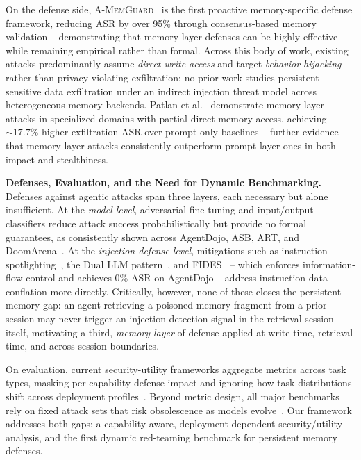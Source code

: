 \documentclass[sigconf]{acmart}
\begin{document}
On the defense side, \textsc{A-MemGuard}~\citep{wei2025amemguard} is the first proactive
memory-specific defense framework, reducing ASR by over 95\% through consensus-based memory
validation -- demonstrating that memory-layer defenses can be highly effective while
remaining empirical rather than formal.
Across this body of work, existing attacks predominantly assume \emph{direct write access}
and target \emph{behavior hijacking} rather than privacy-violating exfiltration; no prior
work studies persistent sensitive data exfiltration under an indirect injection threat model
across heterogeneous memory backends.
Patlan et al.~\citep{patlan2025real,patlan2025context} demonstrate memory-layer attacks
in specialized domains with partial direct memory access, achieving ${\sim}17.7\%$ higher
exfiltration ASR over prompt-only baselines -- further evidence that memory-layer attacks
consistently outperform prompt-layer ones in both impact and stealthiness.

\textbf{Defenses, Evaluation, and the Need for Dynamic Benchmarking.}
Defenses against agentic attacks span three layers, each necessary but alone insufficient.
At the \emph{model level}, adversarial fine-tuning and input/output classifiers reduce
attack success probabilistically but provide no formal guarantees, as consistently shown
across AgentDojo, ASB, ART, and DoomArena~\citep{debenedetti2024agentdojo,zhang2024asb,zou2025art,boisvert2025doomarena,nasr2025attacker}.
At the \emph{injection defense level}, mitigations such as instruction
spotlighting~\citep{hines2024defending}, the Dual LLM pattern~\citep{greshake2023not}, and
\textsc{FIDES}~\citep{costa2025fides} -- which enforces information-flow control and
achieves 0\% ASR on AgentDojo -- address instruction-data conflation more directly.
Critically, however, none of these closes the persistent memory gap: an agent retrieving a
poisoned memory fragment from a prior session may never trigger an injection-detection
signal in the retrieval session itself, motivating a third, \emph{memory layer} of defense
applied at write time, retrieval time, and across session boundaries.

On evaluation, current security-utility frameworks aggregate metrics across task types,
masking per-capability defense impact and ignoring how task distributions shift across
deployment profiles~\citep{zhang2024asb}.
Beyond metric design, all major benchmarks rely on fixed attack sets that risk obsolescence
as models evolve~\citep{pan2026beyond,zhou2025autoredteamer,ferrag2025promptinjections}.
Our framework addresses both gaps: a capability-aware, deployment-dependent 
security/utility analysis, and the first dynamic red-teaming benchmark for persistent
memory defenses.
\end{document}
